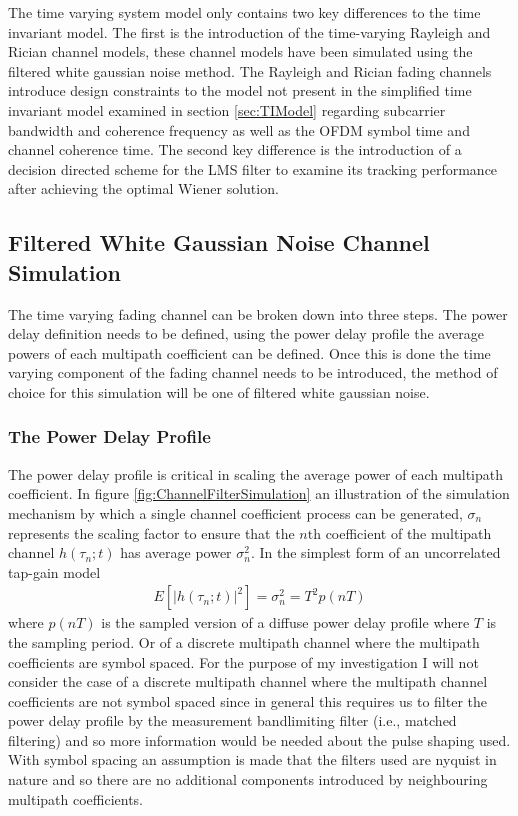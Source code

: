 The time varying system model only contains two key differences to the %
time invariant model. The first is the introduction of the time-varying Rayleigh %
and Rician channel models, these channel models have been simulated using %
the filtered white gaussian noise method. The Rayleigh and Rician fading %
channels introduce design constraints to the model not present in the %
simplified time invariant model examined in section %
\ref{sec:TIModel} regarding subcarrier bandwidth and coherence %
frequency as well as the OFDM symbol time and channel %
coherence time. The second key difference is the introduction %
of a decision directed scheme for the LMS %
filter to examine its tracking performance after achieving %
the optimal Wiener solution.

\subsection{Filtered White Gaussian Noise Channel Simulation}

The time varying fading channel can be broken down into three %
steps. The power delay definition needs to be defined, using the %
power delay profile the average powers of each multipath %
coefficient can be defined. Once this is done the time varying %
component of the fading channel needs to be introduced, %
the method of choice for this simulation will be one of filtered %
white gaussian noise. 
\subsubsection{The Power Delay Profile}

The power delay profile is critical in scaling the average power %
of each multipath coefficient. In figure \ref{fig:ChannelFilterSimulation} %
an illustration of the simulation mechanism by which a single channel %
coefficient process can be generated, $\sigma_{n}$ represents %
the scaling factor to ensure that the $n\text{th}$ coefficient %
of the multipath channel $h(\tau_{n};t)$ has average power %
$\sigma_{n}^{2}$. In the simplest form of an uncorrelated %
tap-gain model \cite{Jer00} 
\begin{align}
	E\left[\lvert h(\tau_{n};t) \rvert^{2} \right] = %
	\sigma_{n}^{2} = T^{2}p(nT)
	\label{eq:TapPower}
\end{align}
where $p(nT)$ is the sampled version of a diffuse power %
delay profile where $T$ is the sampling period. Or of a %
discrete multipath channel where the multipath coefficients %
are symbol spaced. For the purpose of my investigation I %
will not consider the case of a discrete multipath channel %
where the multipath channel coefficients are not symbol %
spaced since in general this requires us to filter the power %
delay profile by the measurement bandlimiting filter (i.e., matched filtering) %
and so more information would be needed about the pulse shaping %
used. With symbol spacing an assumption is made that the filters used %
are nyquist in nature and so there are no additional components %
introduced by neighbouring multipath coefficients.

